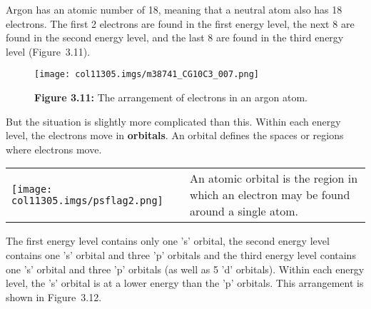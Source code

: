 \begin{enumerate}[noitemsep, label=\textbf{\arabic*}. ]
Argon has an atomic number of 18, meaning that a neutral atom also has 18 electrons. The first 2 electrons are found in the first energy level, the next 8 are found in the second energy level, and the last 8 are found in the third energy level (Figure~3.11).
    \setcounter{subfigure}{0}
	\begin{figure}[H] %
    \begin{center}
    \label{m38741*uid91!!!underscore!!!media}\label{m38741*uid91!!!underscore!!!printimage}\texttt{[image: col11305.imgs/m38741\_CG10C3\_007.png]} %
      \vspace{2pt}
    \vspace{\rubberspace}\par \begin{cnxcaption}
	  \small \textbf{Figure 3.11: }The arrangement of electrons in an argon atom.
	\end{cnxcaption}
    \vspace{.1in}
    \end{center}
 \end{figure}       \end{enumerate}
\label{m38741*id259478}But the situation is slightly more complicated than this. Within each energy level, the electrons move in \textbf{orbitals}. An orbital defines the spaces or regions where electrons move.\par 
\label{m38741*fhsst!!!underscore!!!id687}\begin{definition}
	  \begin{tabular*}{15 cm}{m{15 mm}m{}}
	\hspace*{-50pt}  \texttt{[image: col11305.imgs/psflag2.png]}   & \Definition{   \label{id2420554}\textbf{ Atomic orbital }} { \label{m38741*meaningfhsst!!!underscore!!!id687}
        \label{m38741*id259495}An atomic orbital is the region in which an electron may be found around a single atom.
 \par 
         } 
      \end{tabular*}
      \end{definition}
\label{m38741*id6732}
The first energy level contains only one 's' orbital, the second energy level contains one 's' orbital and three 'p' orbitals and the third energy level contains one 's' orbital and three 'p' orbitals (as well as 5 'd' orbitals). Within each energy level, the 's' orbital is at a lower energy than the 'p' orbitals. This arrangement is shown in Figure~3.12.\par 
